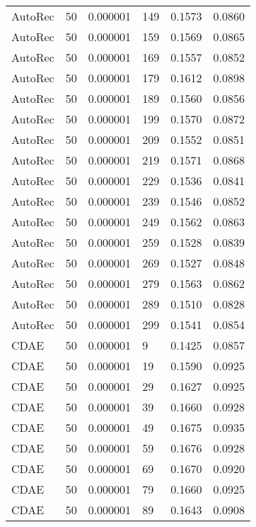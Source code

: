 \begin{tabular}{llrlrr}
 AutoRec &   50 &  0.000001 &   149 &  0.1573 &       0.0860 \\
 AutoRec &   50 &  0.000001 &   159 &  0.1569 &       0.0865 \\
 AutoRec &   50 &  0.000001 &   169 &  0.1557 &       0.0852 \\
 AutoRec &   50 &  0.000001 &   179 &  0.1612 &       0.0898 \\
 AutoRec &   50 &  0.000001 &   189 &  0.1560 &       0.0856 \\
 AutoRec &   50 &  0.000001 &   199 &  0.1570 &       0.0872 \\
 AutoRec &   50 &  0.000001 &   209 &  0.1552 &       0.0851 \\
 AutoRec &   50 &  0.000001 &   219 &  0.1571 &       0.0868 \\
 AutoRec &   50 &  0.000001 &   229 &  0.1536 &       0.0841 \\
 AutoRec &   50 &  0.000001 &   239 &  0.1546 &       0.0852 \\
 AutoRec &   50 &  0.000001 &   249 &  0.1562 &       0.0863 \\
 AutoRec &   50 &  0.000001 &   259 &  0.1528 &       0.0839 \\
 AutoRec &   50 &  0.000001 &   269 &  0.1527 &       0.0848 \\
 AutoRec &   50 &  0.000001 &   279 &  0.1563 &       0.0862 \\
 AutoRec &   50 &  0.000001 &   289 &  0.1510 &       0.0828 \\
 AutoRec &   50 &  0.000001 &   299 &  0.1541 &       0.0854 \\
    CDAE &   50 &  0.000001 &     9 &  0.1425 &       0.0857 \\
    CDAE &   50 &  0.000001 &    19 &  0.1590 &       0.0925 \\
    CDAE &   50 &  0.000001 &    29 &  0.1627 &       0.0925 \\
    CDAE &   50 &  0.000001 &    39 &  0.1660 &       0.0928 \\
    CDAE &   50 &  0.000001 &    49 &  0.1675 &       0.0935 \\
    CDAE &   50 &  0.000001 &    59 &  0.1676 &       0.0928 \\
    CDAE &   50 &  0.000001 &    69 &  0.1670 &       0.0920 \\
    CDAE &   50 &  0.000001 &    79 &  0.1660 &       0.0925 \\
    CDAE &   50 &  0.000001 &    89 &  0.1643 &       0.0908 \\

\end{tabular}
